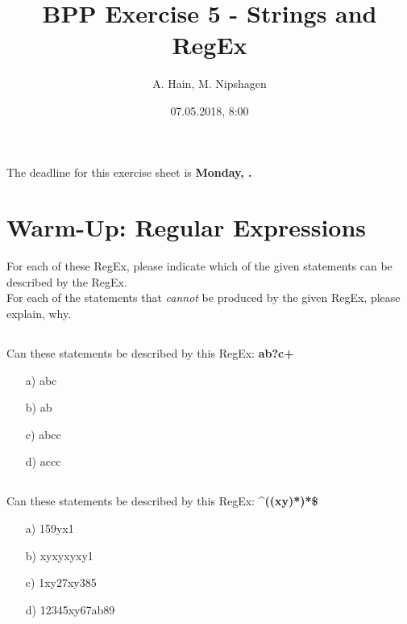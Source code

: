


\title{BPP Exercise 5 - Strings and RegEx}
\author{A. Hain, M. Nipshagen}
\date{07.05.2018, 8:00}

\makeatletter
\let\thetitle\@title
\let\theauthor\@author
\let\thedate\@date
\makeatother

\newcommand\lpb{\small{<}}
\newcommand\rpb{\small{>}}
\newcommand\SubPoint[1]{
  \begin{itemize}
    \item #1
  \end{itemize}
  }





The deadline for this exercise sheet is \textbf{Monday, \thedate.}
%
%

\section{Warm-Up: Regular Expressions}
For each of these RegEx, please indicate which of the given statements can be described by the RegEx.\\
For each of the statements that \textit{cannot} be produced by the given RegEx, please explain, why.

\subsection{}
Can these statements be described by this RegEx: \textbf{ab?c+}
\begin{itemize}
\item[a)] abc 
\item[b)] ab 
\item[c)] abcc 
\item[d)] accc 
\end{itemize}

\subsection{}
Can these statements be described by this RegEx: \textbf{\string^((xy)\textbar[0-9]*)*\$}
\begin{itemize}
\item[a)] 159yx1 
\item[b)] xyxyxyxy1 
\item[c)] 1xy27xy385 
\item[d)] 12345xy67ab89 
\end{itemize}

